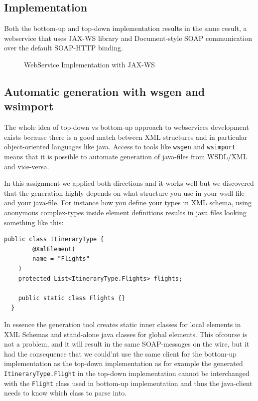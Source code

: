 \documentclass[a4paper, 11pt]{article}
\begin{document}
\subsection*{Implementation}
Both the bottom-up and top-down implementation results in the same result, a webservice that uses JAX-WS library and Document-style SOAP communication over the default SOAP-HTTP binding.
\begin{figure}[H]
  \begin{center}
    \caption{WebService Implementation with JAX-WS}
    \label{fig:fig}
  \end{center}
\end{figure}

\subsection*{Automatic generation with wsgen and wsimport}
The whole idea of top-down vs bottom-up approach to webservices development exists because there is a good match between XML structures and in particular object-oriented languages like java. Access to tools like \texttt{wsgen} and \texttt{wsimport} means that it is possible to automate generation of java-files from WSDL/XML and vice-versa.

In this assignment we applied both directions and it works well but we discovered that the generation highly depends on what structure you use in your wsdl-file and your java-file. For instance how you define your types in XML schema, using anonymous complex-types inside element definitions results in java files looking something like this:
\begin{lstlisting}[frame=single,style=java]
  public class ItineraryType {
        @XmlElement(
        name = "Flights"
    )
    protected List<ItineraryType.Flights> flights;

    public static class Flights {}
  }    
\end{lstlisting}
In essence the generation tool creates static inner classes for local elements in XML Schemas and stand-alone java classes for global elements. This ofcourse is not a problem, and it will result in the same SOAP-messages on the wire, but it had the consequence that we could'nt use the same client for the bottom-up implementation as the top-down implementation as for example the generated \texttt{ItineraryType.Flight} in the top-down implementation cannot be interchanged with the \texttt{Flight} class used in bottom-up implementation and thus the java-client needs to know which class to parse into. 
\end{document}
